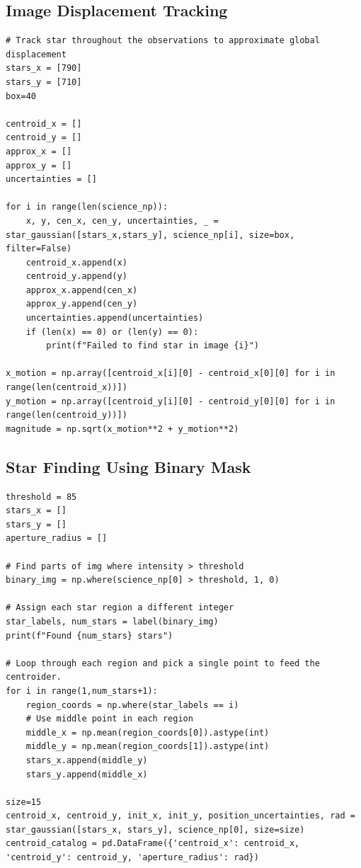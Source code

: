 \documentclass{article}
\begin{document}
\begin{appendices}
\subsection{Image Displacement Tracking}
\begin{scriptsize}
\begin{verbatim}
# Track star throughout the observations to approximate global displacement
stars_x = [790]
stars_y = [710]
box=40

centroid_x = []
centroid_y = []
approx_x = []
approx_y = []
uncertainties = []

for i in range(len(science_np)):
    x, y, cen_x, cen_y, uncertainties, _ = star_gaussian([stars_x,stars_y], science_np[i], size=box, filter=False) 
    centroid_x.append(x)
    centroid_y.append(y)
    approx_x.append(cen_x)
    approx_y.append(cen_y)
    uncertainties.append(uncertainties)
    if (len(x) == 0) or (len(y) == 0):
        print(f"Failed to find star in image {i}")

x_motion = np.array([centroid_x[i][0] - centroid_x[0][0] for i in range(len(centroid_x))])
y_motion = np.array([centroid_y[i][0] - centroid_y[0][0] for i in range(len(centroid_y))])
magnitude = np.sqrt(x_motion**2 + y_motion**2)
\end{verbatim}
\end{scriptsize}

\subsection{Star Finding Using Binary Mask}
\begin{scriptsize}
\begin{verbatim}
threshold = 85
stars_x = []
stars_y = []
aperture_radius = []

# Find parts of img where intensity > threshold
binary_img = np.where(science_np[0] > threshold, 1, 0)

# Assign each star region a different integer
star_labels, num_stars = label(binary_img)
print(f"Found {num_stars} stars")

# Loop through each region and pick a single point to feed the centroider.
for i in range(1,num_stars+1):
    region_coords = np.where(star_labels == i)
    # Use middle point in each region
    middle_x = np.mean(region_coords[0]).astype(int)
    middle_y = np.mean(region_coords[1]).astype(int) 
    stars_x.append(middle_y)
    stars_y.append(middle_x)
    
size=15
centroid_x, centroid_y, init_x, init_y, position_uncertainties, rad = star_gaussian([stars_x, stars_y], science_np[0], size=size)
centroid_catalog = pd.DataFrame({'centroid_x': centroid_x, 'centroid_y': centroid_y, 'aperture_radius': rad})


\end{verbatim}
\end{scriptsize}
\end{appendices}
\end{document}
